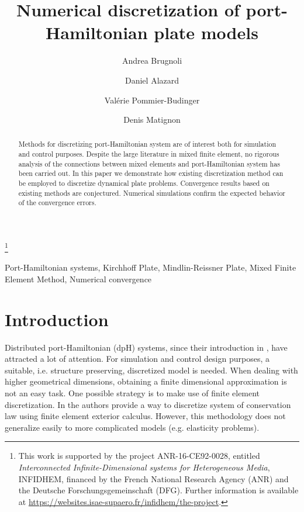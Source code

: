 \documentclass{ifacconf}
\begin{document}
\begin{frontmatter}

\title{Numerical discretization of port-Hamiltonian plate models } 

\thanks[footnoteinfo]{This work is  supported by the project ANR-16-CE92-0028,
	entitled {\em Interconnected Infinite-Dimensional systems for Heterogeneous
		Media}, INFIDHEM, financed by the French National
	Research Agency (ANR) and the Deutsche Forschungsgemeinschaft (DFG). Further information is available at {\url{https://websites.isae-supaero.fr/infidhem/the-project}}.
	}

\author[ISAE]{Andrea Brugnoli}
\author[ISAE]{Daniel Alazard} 
\author[ISAE]{Val\'erie Pommier-Budinger}
\author[ISAE]{Denis Matignon}

\address[ISAE]{ISAE-SUPAERO, Universit\'e de Toulouse, France.\\
	10 Avenue Edouard Belin, BP-54032, 31055 Toulouse Cedex 4. \\
	Andrea.Brugnoli@isae.fr,  Daniel.Alazard@isae.fr, \\
	Valerie.Budinger@isae.fr, Denis.Matignon@isae.fr}

\begin{abstract}
Methods for discretizing port-Hamiltonian system are of interest both for simulation and control purposes. Despite the large literature in mixed finite element, no rigorous analysis of the connections between mixed elements and port-Hamiltonian system has been carried out. In this paper we demonstrate how existing discretization method can be employed to discretize dynamical plate problems. Convergence results based on existing methods are conjectured. Numerical simulations confirm the expected behavior of the convergence errors.
\end{abstract}

\begin{keyword}
Port-Hamiltonian systems, Kirchhoff Plate, Mindlin-Reissner Plate, Mixed Finite Element Method, Numerical convergence
\end{keyword}

\end{frontmatter}

\section{Introduction}
Distributed port-Hamiltonian (dpH) systems, since their introduction in \cite{VANDERSCHAFTdph}, have attracted a lot of attention. For simulation and control design purposes, a suitable, i.e. structure preserving, discretized model is needed. When dealing with higher geometrical dimensions, obtaining a finite dimensional approximation is not an easy task. One possible strategy is to make use of finite element discretization. In \cite{WeakForm_Kot} the authors provide a way to discretize system of conservation law using finite element exterior calculus. However, this methodology does not generalize easily to more complicated models (e.g. elasticity problems).
\end{document}
